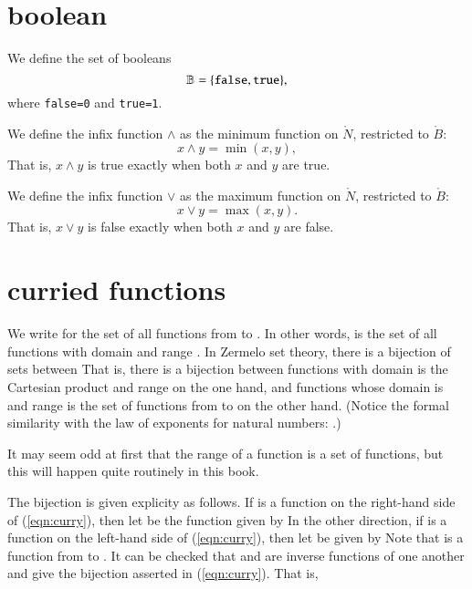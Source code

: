 \documentclass[cup9a]{cupbook}
\begin{document}
\section{boolean}

We define the set of booleans
$$
\ring{B} = \{\verb!false!,\verb!true!\},
$$
where \verb!false=0! and \verb!true=1!.

We define the infix function $\land$ 
as the minimum function on $\ring{N}$, restricted to $\ring{B}$:
$$
x \land y = \min(x,y),
$$
That is, $x\land y$ is true exactly when both $x$ and $y$
are true.

We define the infix function $\lor$ as the maximum
function on $\ring{N}$, restricted to $\ring{B}$:
$$
x\lor y = \max(x,y).
$$
That is, $x\lor y$ is false exactly when both $x$ and $y$ are false.

\section{curried functions}

We write  for the set of all functions from  to .  In other
words,  is the set of all functions with domain  and range .
In Zermelo set theory, there is a bijection of sets between
That is, there is a bijection between functions with domain is the Cartesian product  and range  on the one hand, and functions whose domain is  and range is the set of functions from  to  on the other hand.
(Notice the formal similarity with the law of exponents for natural numbers:
.)

It may seem odd at first that the range of a function is a set of functions, but this will happen quite routinely in this book.

The bijection is given explicity as follows.  If  is a function
on the right-hand side of (\ref{eqn:curry}), then let 
be the function given by 
In the other direction, if  is a function on the left-hand side of (\ref{eqn:curry}), then let  be given by
Note that  is a function from  to .
It can be  checked that  and  are inverse functions of one another and give the bijection asserted in (\ref{eqn:curry}).
That is,
\end{document}
